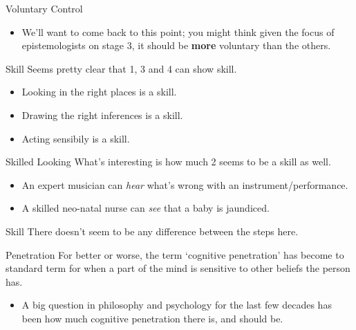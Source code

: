 \documentclass[
  17pt,
  letterpaper,
  ignorenonframetext,
  aspectratio=169,
  xcolor={dvipsnames}]{beamer}
\providecommand{\tightlist}{%
  \setlength{\itemsep}{0pt}\setlength{\parskip}{0pt}}\usepackage{longtable,booktabs,array}
\begin{document}
\begin{frame}{Voluntary Control}
\protect\hypertarget{voluntary-control-2}{}
\begin{itemize}[<+->]
\tightlist
\item
  We'll want to come back to this point; you might think given the focus
  of epistemologists on stage 3, it should be \textbf{more} voluntary
  than the others.
\end{itemize}
\end{frame}

\begin{frame}{Skill}
\protect\hypertarget{skill}{}
Seems pretty clear that 1, 3 and 4 can show skill.

\begin{itemize}[<+->]
\tightlist
\item
  Looking in the right places is a skill.
\item
  Drawing the right inferences is a skill.
\item
  Acting sensibily is a skill.
\end{itemize}
\end{frame}

\begin{frame}{Skilled Looking}
\protect\hypertarget{skilled-looking}{}
What's interesting is how much 2 seems to be a skill as well.

\begin{itemize}[<+->]
\tightlist
\item
  An expert musician can \emph{hear} what's wrong with an
  instrument/performance.
\item
  A skilled neo-natal nurse can \emph{see} that a baby is jaundiced.
\end{itemize}
\end{frame}

\begin{frame}{Skill}
\protect\hypertarget{skill-1}{}
There doesn't seem to be any difference between the steps here.
\end{frame}

\begin{frame}{Penetration}
\protect\hypertarget{penetration}{}
For better or worse, the term `cognitive penetration' has become to
standard term for when a part of the mind is sensitive to other beliefs
the person has.

\begin{itemize}[<+->]
\tightlist
\item
  A big question in philosophy and psychology for the last few decades
  has been how much cognitive penetration there is, and should be.
\end{itemize}
\end{frame}
\end{document}
